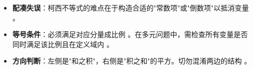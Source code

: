 \begin{trapbox}
\begin{itemize}
    \item \textbf{配凑失误}：柯西不等式的难点在于构造合适的"常数项"或"倒数项"以抵消变量 。
    \item \textbf{等号条件}：必须满足对应分量成比例 。在多元问题中，需检查所有变量是否同时满足该比例且在定义域内 。
    \item \textbf{方向判断}：左侧是"和之积"，右侧是"积之和"的平方。切勿混淆两边的结构 。
\end{itemize}
\end{trapbox}
